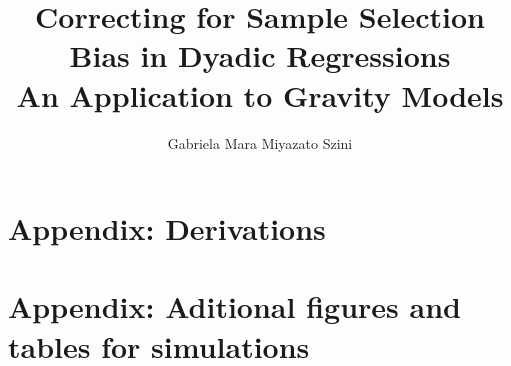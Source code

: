\documentclass[
    11pt,
    a4paper
    ]{mphilthesis}
\author{Gabriela Mara Miyazato Szini}
\title{Correcting for Sample Selection Bias in Dyadic Regressions \\ \large An Application to Gravity Models}
\affiliation{University of Amsterdam}
\begin{document}
\maketitle

\begin{abstract}

\end{abstract}
\tableofcontents

\newpage 












  
\appendix
\section{Appendix: Derivations}


%


\section{Appendix: Aditional figures and tables for simulations}

\end{document}
